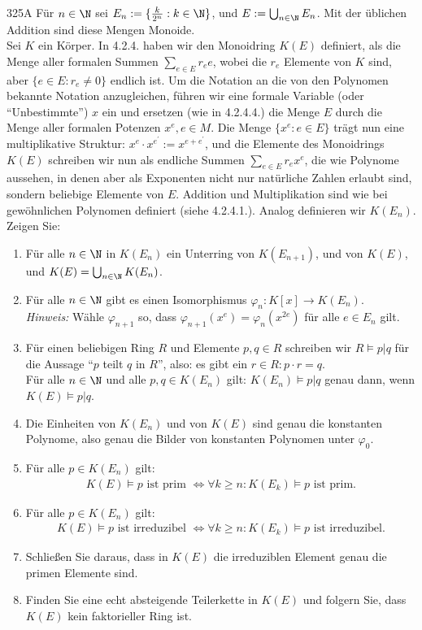\begin{algebraUE}{325A}
Für $n \in \N$ sei $E_n := \{\frac{k}{2^n}: k \in \N\}$, und $E := \bigcup_{n \in \N}E_n$.
Mit der üblichen Addition sind diese Mengen Monoide. \\
Sei $K$ ein Körper. In 4.2.4. haben wir den Monoidring $K(E)$ definiert, als die
Menge aller formalen Summen $\sum_{e \in E}r_ee$, wobei die $r_e$ Elemente von $K$
sind, aber $\{e \in E: r_e \neq 0\}$ endlich ist. Um die Notation an die von den
Polynomen bekannte Notation anzugleichen, führen wir eine formale Variable
(oder ``Unbestimmte'') $x$ ein und ersetzen (wie in 4.2.4.4.) die Menge $E$
durch die Menge aller formalen Potenzen $x^e,e \in M$. Die Menge $\{x^e : e \in E\}$
trägt nun eine multiplikative Struktur: $x^e\cdot x^{e^{\prime}} := x^{e+e^{\prime}}$,
und die Elemente des Monoidrings $K(E)$ schreiben wir nun als endliche Summen
$\sum_{e \in E}r_e x^e$, die wie Polynome aussehen, in denen aber als Exponenten
nicht nur natürliche Zahlen erlaubt sind, sondern beliebige Elemente von $E$.
Addition und Multiplikation sind wie bei gewöhnlichen Polynomen definiert
(siehe 4.2.4.1.). Analog definieren wir $K(E_n)$. Zeigen Sie:
\begin{enumerate}
  \item Für alle $n \in \N$ in $K(E_n)$ ein Unterring von $K(E_{n+1})$, und von
  $K(E)$, und $K(E) = \bigcup_{n \in \N}K(E_n)$.
  \item Für alle $n \in \N$ gibt es einen Isomorphismus $\varphi_n: K[x] \to K(E_n)$. \\
  \textit{Hinweis:} Wähle $\varphi_{n+1}$ so, dass $\varphi_{n+1}(x^e) = \varphi_{n}(x^{2e})$
  für alle $e \in E_n$ gilt.
  \item Für einen beliebigen Ring $R$ und Elemente $p,q \in R$ schreiben wir $R \vDash p|q$
  für die Aussage ``$p$ teilt $q$ in $R$'', also: es gibt ein $r \in R: p\cdot r = q$. \\
  Für alle $n \in \N$ und alle $p,q \in K(E_n)$ gilt: $K(E_n) \vDash p|q$
  genau dann, wenn $K(E) \vDash p|q$.
  \item Die Einheiten von $K(E_n)$ und von $K(E)$ sind genau die konstanten Polynome,
  also genau die Bilder von konstanten Polynomen unter $\varphi_0$.
  \item Für alle $p \in K(E_n)$ gilt:
  \begin{align*}
    K(E) \vDash p \text{ ist prim } \iff \forall k \geq n: K(E_k) \vDash p \text{ ist prim}.
  \end{align*}
  \item Für alle $p \in K(E_n)$ gilt:
  \begin{align*}
    K(E) \vDash p \text{ ist irreduzibel } \iff \forall k \geq n: K(E_k) \vDash p \text{ ist irreduzibel}.
  \end{align*}
  \item Schließen Sie daraus, dass in $K(E)$ die irreduziblen Element genau die primen Elemente sind.
  \item Finden Sie eine echt absteigende Teilerkette in $K(E)$ und folgern Sie, dass $K(E)$
  kein faktorieller Ring ist.
\end{enumerate}
\end{algebraUE}

